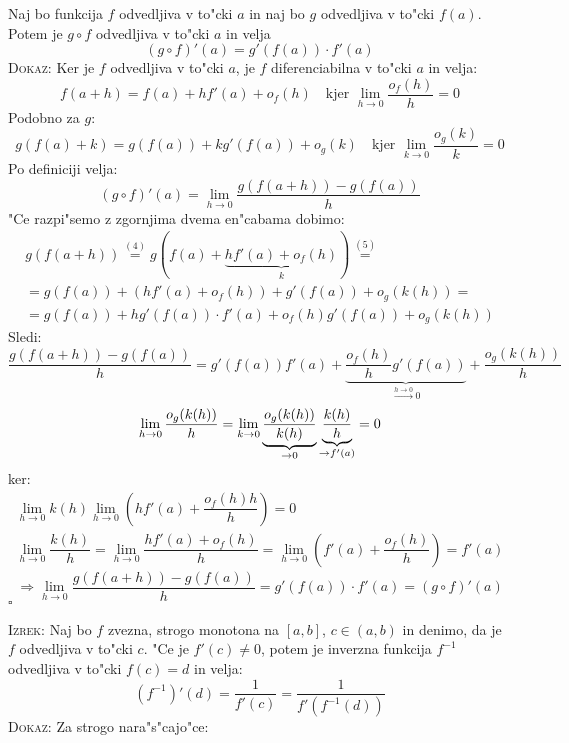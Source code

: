 \begin{enumerate}
Naj bo funkcija $f$ odvedljiva v to"cki $a$ in naj bo $g$ odvedljiva v to"cki $f(a)$. Potem je $g \circ f$ odvedljiva v to"cki $a$ in velja
\begin{equation*}
(g \circ f)'(a) = g'(f(a)) \cdot f'(a)
\end{equation*}
\textsc{Dokaz:} Ker je $f$ odvedljiva v to"cki $a$, je $f$ diferenciabilna v to"cki $a$ in velja:
\begin{equation}
f(a+h) = f(a) + hf'(a) + o_f(h) \quad \text{kjer } \lim_{h \to 0} \dfrac{o_f(h)}{h} = 0
\end{equation}
Podobno za $g$:
\begin{equation}
g(f(a) + k) = g(f(a)) + k g'(f(a)) + o_g(k) \quad \text{kjer } \lim_{k \to 0} \dfrac{o_g(k)}{k} = 0
\end{equation}
Po definiciji velja:
\begin{equation*}
(g \circ f)'(a) = \lim_{h \to 0} \dfrac{g(f(a+h)) - g(f(a))}{h}
\end{equation*}
"Ce razpi"semo z zgornjima dvema en"cabama dobimo:
\begin{multline*}
g(f(a+h)) \stackrel{(4)}{=} g(f(a) + \underbrace{hf'(a) + o_f(h)}_{k}) \stackrel{(5)}{=} \\
= g(f(a)) + (hf'(a) + o_f(h)) + g'(f(a)) + o_g(k(h)) = \\
= g(f(a)) + hg'(f(a)) \cdot f'(a) + o_f(h) g'(f(a)) + o_g(k(h))
\end{multline*}
Sledi:
\begin{equation*}
\dfrac{g(f(a+h)) - g(f(a))}{h} = g'(f(a))f'(a) + \underbrace{\dfrac{o_f(h)}{h} g'(f(a))}_{\stackrel{h \to 0}{\longrightarrow} 0} + \dfrac{o_g(k(h))}{h}
\end{equation*}
%
\begin{equation*}
\lim_{h \to 0} \dfrac{o_g(k(h))}{h} = \lim_{k \to 0} \underbrace{\dfrac{o_g(k(h))}{k(h)}}_{\to 0} \underbrace{\dfrac{k(h)}{h}}_{\to f'(a)} = 0 \\
\end{equation*}
ker:
\begin{gather*}
\lim_{h \to 0} k(h) \lim_{h \to 0} \left(hf'(a) + \dfrac{o_f(h) h}{h}\right) = 0 \\
\lim_{h \to 0} \dfrac{k(h)}{h} = \lim_{h \to 0} \dfrac{hf'(a) + o_f(h)}{h} = \lim_{h \to 0} \left(f'(a) + \dfrac{o_f(h)}{h}\right) = f'(a)
\end{gather*}
\begin{equation*}
\Rightarrow \lim_{h \to 0} \dfrac{g(f(a+h)) - g(f(a))}{h} = g'(f(a)) \cdot f'(a) = (g \circ f)'(a)
\end{equation*}
\hfill $\square$
\end{enumerate}
%
\textsc{Izrek:} Naj bo $f$ zvezna, strogo monotona na $[a, b]$, $c \in (a, b)$ in denimo, da je $f$ odvedljiva v to"cki $c$. "Ce je $f'(c) \neq 0$, potem je inverzna funkcija $f^{-1}$ odvedljiva v to"cki $f(c) = d$ in velja:
\begin{equation*}
(f^{-1})'(d) = \dfrac{1}{f'(c)} = \dfrac{1}{f'(f^{-1}(d))}
\end{equation*}
\textsc{Dokaz:} Za strogo nara"s"cajo"ce:

